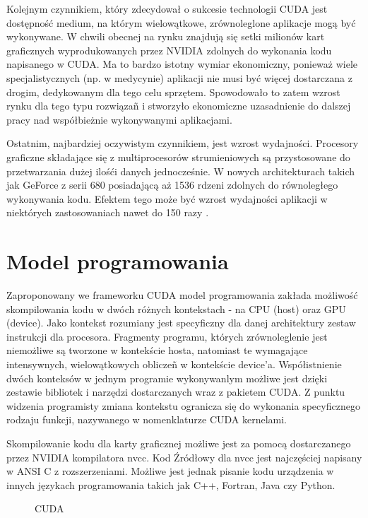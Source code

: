 Kolejnym czynnikiem, który zdecydował o sukcesie technologii CUDA jest dostępność medium, na którym wielowątkowe, zrównoleglone aplikacje mogą być wykonywane. W chwili obecnej na rynku znajdują się setki milionów kart graficznych wyprodukowanych przez NVIDIA zdolnych do wykonania kodu napisanego w CUDA. Ma to bardzo istotny wymiar ekonomiczny, ponieważ wiele specjalistycznych (np. w medycynie) aplikacji nie musi być więcej dostarczana z drogim, dedykowanym dla tego celu sprzętem. Spowodowało to zatem wzrost rynku dla tego typu rozwiązañ i stworzyło ekonomiczne uzasadnienie do dalszej pracy nad współbieżnie wykonywanymi aplikacjami.

Ostatnim, najbardziej oczywistym czynnikiem, jest wzrost wydajności. Procesory graficzne składające się z multiprocesorów strumieniowych są przystosowane do przetwarzania dużej ilośći danych jednocześnie. W nowych architekturach takich jak GeForce z serii 680 posiadającą aż 1536 rdzeni zdolnych do równoległego wykonywania kodu. Efektem tego może być wzrost wydajności aplikacji w niektórych zastosowaniach nawet do 150 razy \cite{prez}.

\section{Model programowania}

Zaproponowany we frameworku CUDA model programowania zakłada możliwość skompilowania kodu w dwóch różnych kontekstach - na CPU (host) oraz GPU (device). Jako kontekst rozumiany jest specyficzny dla danej architektury zestaw instrukcji dla procesora. Fragmenty programu, których zrównoleglenie jest niemożliwe są tworzone w kontekście hosta, natomiast te wymagające intensywnych, wielowątkowych obliczeñ w kontekście device'a. Współistnienie dwóch konteksów w jednym programie wykonywanlym możliwe jest dzięki zestawie bibliotek i narzędzi dostarczanych wraz z pakietem CUDA. Z punktu widzenia programisty zmiana kontekstu ogranicza się do wykonania specyficznego rodzaju funkcji, nazywanego w nomenklaturze CUDA kernelami.

Skompilowanie kodu dla karty graficznej możliwe jest za pomocą dostarczanego przez NVIDIA kompilatora nvcc. Kod Źródłowy dla nvcc jest najczęściej napisany w ANSI C z rozszerzeniami. Możliwe jest jednak pisanie kodu urządzenia w innych językach programowania takich jak C++, Fortran, Java czy Python. 

\begin{figure}[ht]
\centering

\caption{CUDA}
\label{cuda-model}
\end{figure}

